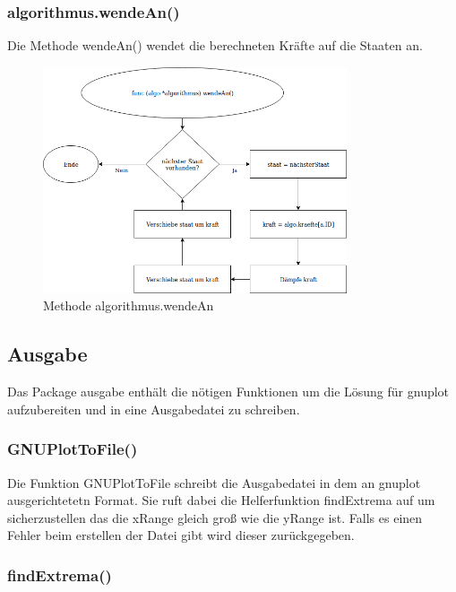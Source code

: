 \FloatBarrier

\subsubsection{algorithmus.wendeAn()}

Die Methode wendeAn() wendet die berechneten Kräfte auf die Staaten an.

\begin{figure}[h!]
    \centering
    \includegraphics[width=0.8\textwidth,]{wendeAn.png}
    \caption[]{Methode algorithmus.wendeAn}
\end{figure}

\pagebreak

\subsection{Ausgabe}

Das Package ausgabe enthält die nötigen Funktionen um die Lösung für gnuplot aufzubereiten und in eine Ausgabedatei zu schreiben.

\subsubsection{GNUPlotToFile()}

Die Funktion GNUPlotToFile schreibt die Ausgabedatei in dem an gnuplot ausgerichtetetn Format.
Sie ruft dabei die Helferfunktion findExtrema auf um sicherzustellen das die xRange gleich groß wie die yRange ist.
Falls es einen Fehler beim erstellen der Datei gibt wird dieser zurückgegeben.

\subsubsection{findExtrema()}

